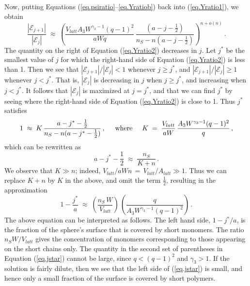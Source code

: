\documentclass[journal=mamobx,manuscript=article]{achemso}
\begin{document}
Now, putting Equations (\ref{eq.psiratio}--\ref{eq.Yratiob}) back into (\ref{eq.Yratio1}), we obtain
\begin{equation}
    \label{eq.Yratio2}
       \frac{|\mathcal{E}_{j+1}|}{|\mathcal{E}_j|} \; \approx \; 
       \left(  \frac{ V_{latt}A_3W^{\gamma_3-1}(q-1)^2}{aWq} \,
          \frac{(a-j-\frac{1}{2})}{n_S-n(a-j-\frac{1}{2})} \right)^{n+o(n)}   \,.
\end{equation}
The quantity on the right of Equation (\ref{eq.Yratio2}) decreases in $j$.  Let $j^*$ be the 
smallest value of $j$ for which the right-hand side of Equation (\ref{eq.Yratio2}) is less than 1.
Then we see that $|\mathcal{E}_{j+1}|/|\mathcal{E}_j|<1$ whenever $j\geq j^*$, and 
$|\mathcal{E}_{j+1}|/|\mathcal{E}_j|\geq 1$ whenever $j< j^*$.
That is, $|\mathcal{E}_j|$ is decreasing in $j$ when $j\geq j^*$, and 
increasing when $j< j^*$.
It follows that $|\mathcal{E}_j|$ is maximized at $j=j^*$, and that we can find $j^*$ by seeing 
where the right-hand side of Equation (\ref{eq.Yratio2}) is close to 1.   Thus $j^*$ satisfies
\[     1  \;\approx \; 
     K  \,%
          \frac{a-j^*-\frac{1}{2}}{n_S-n(a-j^*-\frac{1}{2})}    \,,  
             \hspace{5mm}\hbox{where}\hspace{5mm}
             K \;=\;   \frac{ V_{latt} }{aW}\, \frac{   A_3W^{\gamma_3-1}(q-1)^2}{q} \,,
\]
which can be rewritten as 
\[       a-j^*-\frac{1}{2} \; \approx\;    \frac{n_S}{K+n}   \,.
\]
We observe that $K\gg n$; indeed,  $V_{latt}/aWn \,=\,V_{latt}/A_{latt}\gg 1$.  
Thus we can replace $K+n$ by $K$ in the above, and omit the term $\frac{1}{2}$, resulting in the   
approximation 
\begin{equation}
    \label{eq.jstar}
     1-\frac{j^*}{a}     \; \approx   \; 
        \left(  \frac{n_S\,W}{V_{latt} }\right) \,\left(   \frac{q}{A_3W^{\gamma_3-1}(q-1)^2}\right)  \,.
\end{equation}
The above equation can be interpreted as follows.  The left hand side, $1-j^*/a$, is the fraction of the
sphere's surface that is covered by short monomers.  The ratio $n_SW/V_{latt}$ gives
the concentration of monomers corresponding to those appearing on the short chains only.
The quantity in the second set of 
parentheses in Equation (\ref{eq.jstar}) cannot be large, since $q<(q-1)^2$ and $\gamma_3>1$.
If the solution is fairly dilute, then we see that the left side of (\ref{eq.jstar}) is small,
and hence only a small fraction of the surface is covered by short polymers.
\end{document}
